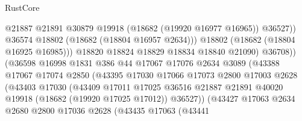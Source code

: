 \begin{lexlean}{RustCore}
\begin{coremodule}
                                          @21887
                                          @21891
                                          @30879
                                          @19918
                                          (@18682 (@19920 @16977 @16965))
                                          @36527))
                                      @36574
                                      @18802
                                      (@18682 (@18804 @16957 @2634)))
                                    @18802
                                    (@18682 (@18804 @16925 @16985)))
                                  @18820
                                  @18824
                                  @18829
                                  @18834
                                  @18840
                                  @21090)
                                @36708))
                            (@36598
                              @16998
                              @1831
                              @386
                              @44
                              @17067
                              @17076
                              @2634
                              @3089
                              (@43388
                                @17067
                                @17074
                                @2850
                                (@43395
                                  @17030
                                  @17066
                                  @17073
                                  @2800
                                  @17003
                                  @2628
                                  (@43403
                                    @17030
                                    (@43409
                                      @17011
                                      @17025
                                      @36516
                                      @21887
                                      @21891
                                      @40020
                                      @19918
                                      (@18682 (@19920 @17025 @17012))
                                      @36527))
                                  (@43427
                                    @17063
                                    @2634
                                    @2680
                                    @2800
                                    @17036
                                    @2628
                                    (@43435
                                      @17063
                                      (@43441

\end{coremodule}
\end{lexlean}
